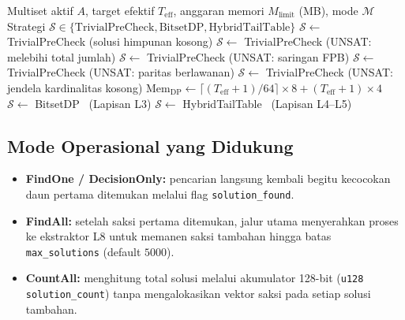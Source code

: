 \documentclass[journal,onecolumn,11pt]{IEEEtran}
\begin{document}
\begin{algorithm}[h]
\caption{Logika Pemilihan Strategi Router Adaptif}
\label{alg:router}
\begin{algorithmic}[1]
\REQUIRE Multiset aktif $A$, target efektif $T_{\text{eff}}$, anggaran memori $M_{\text{limit}}$ (MB), mode $\mathcal{M}$
\ENSURE Strategi $\mathcal{S} \in \{\text{TrivialPreCheck}, \text{BitsetDP}, \text{HybridTailTable}\}$
    \RETURN $\mathcal{S}\leftarrow$ TrivialPreCheck (solusi himpunan kosong)
\ENDIF
{}
    \RETURN $\mathcal{S}\leftarrow$ TrivialPreCheck (UNSAT: melebihi total jumlah)
\ENDIF
{}
    \RETURN $\mathcal{S}\leftarrow$ TrivialPreCheck (UNSAT: saringan FPB)
\ENDIF
{}
    \RETURN $\mathcal{S}\leftarrow$ TrivialPreCheck (UNSAT: paritas berlawanan)
\ENDIF
{}
    \RETURN $\mathcal{S}\leftarrow$ TrivialPreCheck (UNSAT: jendela kardinalitas kosong)
\ENDIF
\STATE $\text{Mem}_{\text{DP}} \leftarrow \big\lceil (T_{\text{eff}}+1)/64 \big\rceil \times 8 + (T_{\text{eff}}+1)\times 4$
    \RETURN $\mathcal{S}\leftarrow$ BitsetDP \ (Lapisan L3)
\ELSE
    \RETURN $\mathcal{S}\leftarrow$ HybridTailTable \ (Lapisan L4--L5)
\ENDIF
\end{algorithmic}
\end{algorithm}

\subsection{Mode Operasional yang Didukung}
\begin{itemize}
    \item \textbf{FindOne / DecisionOnly:} pencarian langsung kembali begitu kecocokan daun pertama ditemukan melalui flag \texttt{solution\_found}.
    \item \textbf{FindAll:} setelah saksi pertama ditemukan, jalur utama menyerahkan proses ke ekstraktor L8 untuk memanen saksi tambahan hingga batas \texttt{max\_solutions} (default $5000$).
    \item \textbf{CountAll:} menghitung total solusi melalui akumulator 128-bit (\texttt{u128 solution\_count}) tanpa mengalokasikan vektor saksi pada setiap solusi tambahan.
\end{itemize}
\end{document}
